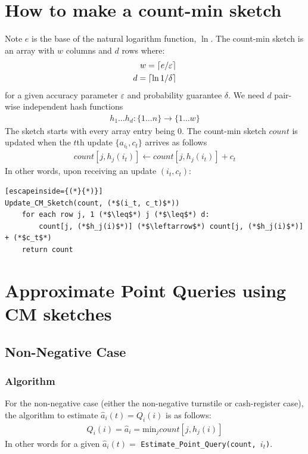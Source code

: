 \documentclass[11pt]{article}
\newcommand{\comment}[1]{}
\newcommand{\sq}{\mathit{Q}_i}
\DeclarePairedDelimiter\ceil{\lceil}{\rceil}
\newcommand{\ra}{\rightarrow}
\begin{document}
\section{How to make a count-min sketch}
Note $e$ is the base of the natural logarithm function, $\ln$. The count-min
sketch is an array with $w$ columns and $d$ rows where:
\begin{align}
    w = \ceil{e/\varepsilon}\\
    d = \ceil{\ln{1/\delta}}
\end{align}
for a given accuracy parameter $\varepsilon$ and probability guarantee $\delta$.
We need $d$ pair-wise independent hash functions
\begin{align}
    h_1 \dots h_d : \{1 \dots n\} \ra \{1 \dots w\} 
\end{align}
The sketch starts with every array entry being 0. The count-min sketch $count$
is updated when the $t$th update $\{a_{i_t}, c_t\}$ arrives as follows
\begin{align}
    count[j, h_j(i_t)] \leftarrow count[j, h_j(i_t)] + c_t     
\end{align}
In other words, upon receiving an update $(i_t, c_t)$:
\begin{lstlisting}[escapeinside={(*}{*)}]
Update_CM_Sketch(count, (*$(i_t, c_t)$*)) 
    for each row j, 1 (*$\leq$*) j (*$\leq$*) d:
        count[j, (*$h_j(i)$*)] (*$\leftarrow$*) count[j, (*$h_j(i)$*)] + (*$c_t$*)
    return count 
\end{lstlisting}

\comment{
\begin{enumerate}
    \item for each row $1 \leq j \leq d$
    \begin{enumerate}
        \item add $c_t$ to the $h_j(i)$th column.
    \end{enumerate}
\end{enumerate}
}


\section{Approximate Point Queries using CM sketches}

\subsection{Non-Negative Case}
\subsubsection{Algorithm}
For the non-negative case (either the non-negative turnstile or cash-register case),
the algorithm to estimate $\hat{a}_i(t) = \sq(i)$ is as follows: 
\begin{align}
    \sq(i) = \hat{a}_i = \text{min}_j count[j, h_j(i)]
\end{align}
In other words for a given $\hat a_i(t) =$ \texttt{Estimate\_Point\_Query(count, $i_t$)}.
\end{document}
